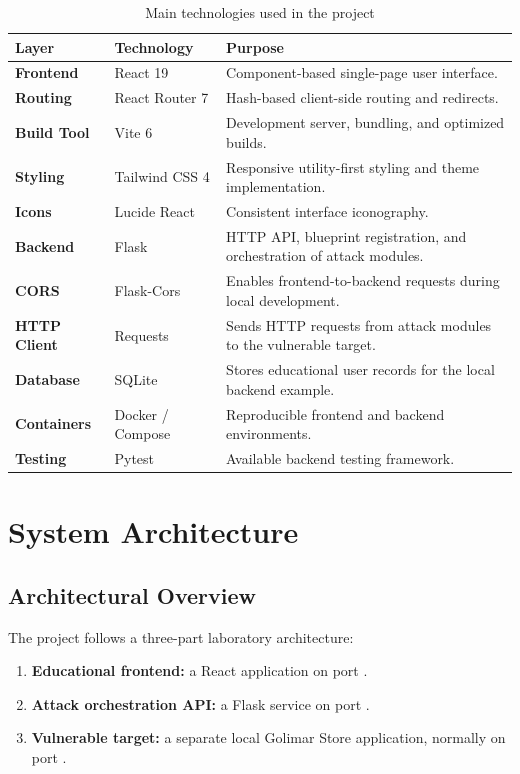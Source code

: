 \documentclass[12pt,a4paper]{article}
\newcommand{\code}[1]{\texttt{\detokenize{#1}}}
\begin{document}
\begin{table}[H]
\centering
\caption{Main technologies used in the project}
\label{tab:technology-stack}
\begin{tabularx}{\textwidth}{>{\bfseries}p{3.0cm}p{3.2cm}X}
\toprule
Layer & Technology & Purpose \\
\midrule
Frontend & React 19 & Component-based single-page user interface. \\
Routing & React Router 7 & Hash-based client-side routing and redirects. \\
Build Tool & Vite 6 & Development server, bundling, and optimized builds. \\
Styling & Tailwind CSS 4 & Responsive utility-first styling and theme implementation. \\
Icons & Lucide React & Consistent interface iconography. \\
Backend & Flask & HTTP API, blueprint registration, and orchestration of attack modules. \\
CORS & Flask-Cors & Enables frontend-to-backend requests during local development. \\
HTTP Client & Requests & Sends HTTP requests from attack modules to the vulnerable target. \\
Database & SQLite & Stores educational user records for the local backend example. \\
Containers & Docker / Compose & Reproducible frontend and backend environments. \\
Testing & Pytest & Available backend testing framework. \\
\bottomrule
\end{tabularx}
\end{table}

\section{System Architecture}

\subsection{Architectural Overview}

The project follows a three-part laboratory architecture:

\begin{enumerate}[leftmargin=1.4cm]
    \item \textbf{Educational frontend:} a React application on port \code{3000}.
    \item \textbf{Attack orchestration API:} a Flask service on port \code{5000}.
    \item \textbf{Vulnerable target:} a separate local Golimar Store application, normally on port \code{2000}.
\end{enumerate}
\end{document}
